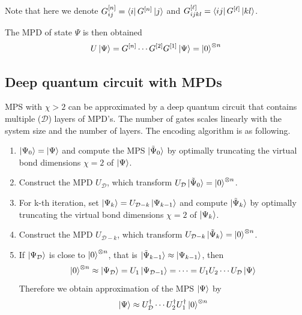 \documentclass[11pt, oneside]{article}   	%
\begin{document}
Note that here we denote $G^{[n]}_{ij} = \bra{i} G^{[n]} \ket{j}$ and $G^{[\ell]}_{ijkl} = \bra{ij} G^{[\ell]} \ket{kl}$.

The MPD of state $\Psi$ is then obtained 
\begin{equation}
U \ket{\Psi} = G^{[n]} \cdots G^{[2]} G^{[1]} \ket{\Psi} = \ket{0}^{\otimes n}
\end{equation}

\subsection{Deep quantum circuit with MPDs}
MPS with $\chi > 2$ can be approximated by a deep quantum circuit that contains multiple ($\mathcal{D}$) layers of MPD’s.
The number of gates scales linearly with the system size and the number of layers. 
The encoding algorithm is as following.


\begin{enumerate}
\item
$\ket{\Psi_0} =  \ket{\Psi}$ and compute the MPS $\ket{\tilde{\Psi}_0}$ by optimally truncating the virtual bond dimensions $\chi = 2$ of $\ket{\Psi}$.
\item
Construct the MPD $U_{\mathcal{D}}$, which transform $U_{\mathcal{D}} \ket{\tilde{\Psi}_0} = \ket{0}^{\otimes n}$.
\item
For k-th iteration, set $\ket{\Psi_k} = U_{\mathcal{D}-k} \ket{\Psi_{k-1}}$ and compute $\ket{\tilde{\Psi}_k}$ by optimally truncating the virtual bond dimensions $\chi = 2$ of $\ket{\Psi_k}$.
\item
Construct the MPD $U_{\mathcal{D}-k}$, which transform $U_{\mathcal{D}-k} \ket{\tilde{\Psi}_k} = \ket{0}^{\otimes n}$.
\item
If $\ket{\Psi_{\mathcal{D}}}$ is close to $\ket{0}^{\otimes n}$, that is $\ket{\tilde{\Psi}_{k-1}} \approx \ket{\Psi_{k-1}}$, then 
\begin{equation}
\ket{0}^{\otimes n} \approx \ket{\Psi_{\mathcal{D}}} = U_1 \ket{\Psi_{\mathcal{D}-1}} = \cdots = U_1 U_2 \cdots U_{\mathcal{D}} \ket{\Psi}
\end{equation}
Therefore we obtain approximation of the MPS $\ket{\Psi}$ by
\begin{equation}
\ket{\Psi} \approx U^{\dagger}_{\mathcal{D}} \cdots U^{\dagger}_2 U^{\dagger}_1  \ket{0}^{\otimes n}
\end{equation}
\end{enumerate}
\end{document}
